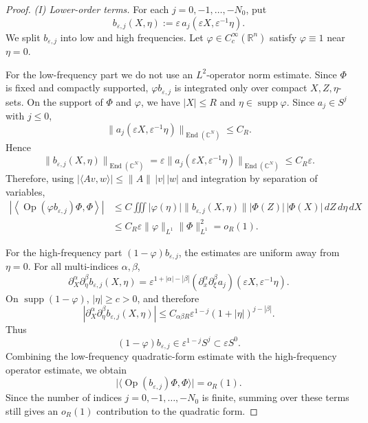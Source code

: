 \documentclass[10pt,a4paper]{amsart}
\begin{document}
\begin{proof}
	\smallskip
	\noindent\emph{(I) Lower-order terms.}
	For each \(j=0,-1,\ldots,-N_0\), put
	\[
	b_{\varepsilon,j}(X,\eta)
	:=
	\varepsilon\,a_j(\varepsilon X,\varepsilon^{-1}\eta).
	\]
	We split \(b_{\varepsilon,j}\) into low and high frequencies. Let
	\(\varphi\in C_c^\infty(\mathbb R^n)\) satisfy \(\varphi\equiv1\) near
	\(\eta=0\).
	
	For the low-frequency part we do not use an \(L^2\)-operator norm estimate.
	Since \(\Phi\) is fixed and compactly supported, \(\varphi b_{\varepsilon,j}\)
	is integrated only over compact \(X,Z,\eta\)-sets. On the support of \(\Phi\) and \(\varphi\), we have \(|X|\le R\) and
	\(\eta\in \operatorname{supp}\varphi\). Since \(a_j\in S^j\) with \(j\le0\),
	\[
	\|a_j(\varepsilon X,\varepsilon^{-1}\eta)\|_{\operatorname{End}(\mathbb C^N)}
	\le C_R.
	\]
	Hence
	\[
	\|b_{\varepsilon,j}(X,\eta)\|_{\operatorname{End}(\mathbb C^N)}
	=
	\varepsilon
	\|a_j(\varepsilon X,\varepsilon^{-1}\eta)\|_{\operatorname{End}(\mathbb C^N)}
	\le C_R\varepsilon.
	\]
	Therefore, using \(|\langle Av,w\rangle|\le \|A\|\,|v|\,|w|\) and integration by separation of variables,
	\[
	\begin{aligned}
		\left|
		\left\langle
		\operatorname{Op}(\varphi b_{\varepsilon,j})\Phi,\Phi
		\right\rangle
		\right|
		&\le
		C
		\iiint
		|\varphi(\eta)|
		\|b_{\varepsilon,j}(X,\eta)\|
		|\Phi(Z)|\,|\Phi(X)|
		\,dZ\,d\eta\,dX  \\
		&\le
		C_R\varepsilon
		\|\varphi\|_{L^1}
		\|\Phi\|_{L^1}^2
		=o_R(1).
	\end{aligned}
	\]
	
	For the high-frequency part \((1-\varphi)b_{\varepsilon,j}\), the estimates are
	uniform away from \(\eta=0\). For all multi-indices \(\alpha,\beta\),
	\[
	\partial_X^\alpha\partial_\eta^\beta b_{\varepsilon,j}(X,\eta)
	=
	\varepsilon^{1+|\alpha|-|\beta|}
	(\partial_x^\alpha\partial_\xi^\beta a_j)(\varepsilon X,\varepsilon^{-1}\eta).
	\]
	On \(\operatorname{supp}(1-\varphi)\), \(|\eta|\ge c>0\), and therefore
	\[
	|\partial_X^\alpha\partial_\eta^\beta b_{\varepsilon,j}(X,\eta)|
	\le
	C_{\alpha\beta R}\varepsilon^{1-j}(1+|\eta|)^{j-|\beta|}.
	\]
	Thus
	\[
	(1-\varphi)b_{\varepsilon,j}\in \varepsilon^{1-j}S^j
	\subset \varepsilon S^0 .
	\]
	Combining the low-frequency quadratic-form estimate with the high-frequency
	operator estimate, we obtain
	\[
	\bigl|\langle\operatorname{Op}(b_{\varepsilon,j})\Phi,\Phi\rangle\bigr|
	=o_R(1).
	\]
	Since the number of indices \(j=0,-1,\ldots,-N_0\) is finite, summing over
	these terms still gives an \(o_R(1)\) contribution to the quadratic form.	
	

\end{proof}
\end{document}
